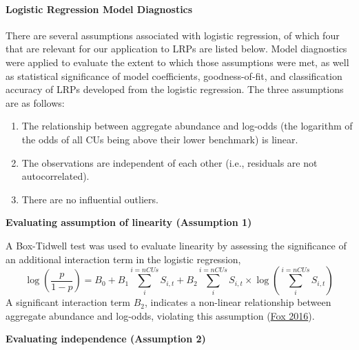 \documentclass[11pt]{book}
\begin{document}
\hypertarget{logistic-regression-model-diagnostics}{%
\paragraph{Logistic Regression Model Diagnostics}\label{logistic-regression-model-diagnostics}}

There are several assumptions associated with logistic regression, of which four that are relevant for our application to LRPs are listed below. Model diagnostics were applied to evaluate the extent to which those assumptions were met, as well as statistical significance of model coefficients, goodness-of-fit, and classification accuracy of LRPs developed from the logistic regression. The three assumptions are as follows:
\begin{enumerate}
\def\labelenumi{\arabic{enumi}.}
\item
  The relationship between aggregate abundance and log-odds (the logarithm of the odds of all CUs being above their lower benchmark) is linear.
\item
  The observations are independent of each other (i.e., residuals are not autocorrelated).
\item
  There are no influential outliers.
\end{enumerate}
\textbf{Evaluating assumption of linearity (Assumption 1)}

A Box-Tidwell test was used to evaluate linearity by assessing the significance of an additional interaction term in the logistic regression,
\begin{equation}
  \log(\frac{p}{1-p}) = B_0 + B_1 \sum_{i}^{i=nCUs} S_{i,t} + B_2 \sum_{i}^{i=nCUs} S_{i,t} \times \log (\sum_{i}^{i=nCUs} S_{i,t})
   \label{eq:BoxTidwelllogistic}
\end{equation}
A significant interaction term \(B_2\), indicates a non-linear relationship between aggregate abundance and log-odds, violating this assumption (\protect\hyperlink{ref-foxAppliedRegressionAnalysis2016}{Fox 2016}).

\textbf{Evaluating independence (Assumption 2)}
\end{document}
